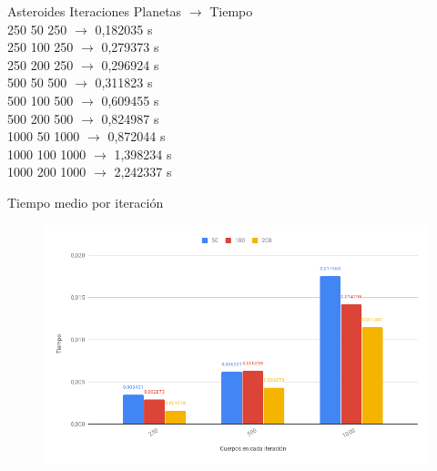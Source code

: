 \documentclass[12pt]{article}
\begin{document}
\begin{enumerate}[label=(\Alph*)]
                \begin{center}
                    \noindent Asteroides Iteraciones Planetas $\rightarrow$ Tiempo \\
                    250 50 250 $\rightarrow$ 0,182035 s \\
                    250 100 250 $\rightarrow$ 0,279373 s \\
                    250 200 250 $\rightarrow$ 0,296924 s \\
                    500 50 500 $\rightarrow$ 0,311823 s \\
                    500 100 500 $\rightarrow$ 0,609455 s \\
                    500 200 500 $\rightarrow$ 0,824987 s \\
                    1000 50 1000 $\rightarrow$ 0,872044 s \\
                    1000 100 1000 $\rightarrow$ 1,398234 s \\
                    1000 200 1000 $\rightarrow$ 2,242337 s \\
                \end{center}
                
                \newpage
                \begin{center}
                    Tiempo medio por iteración
                \end{center}
                \begin{figure}[hbt!]
                    \centering
                    \includegraphics[width=\linewidth]{images/chart12.png}
                \end{figure}
                

\end{enumerate}
\end{document}
